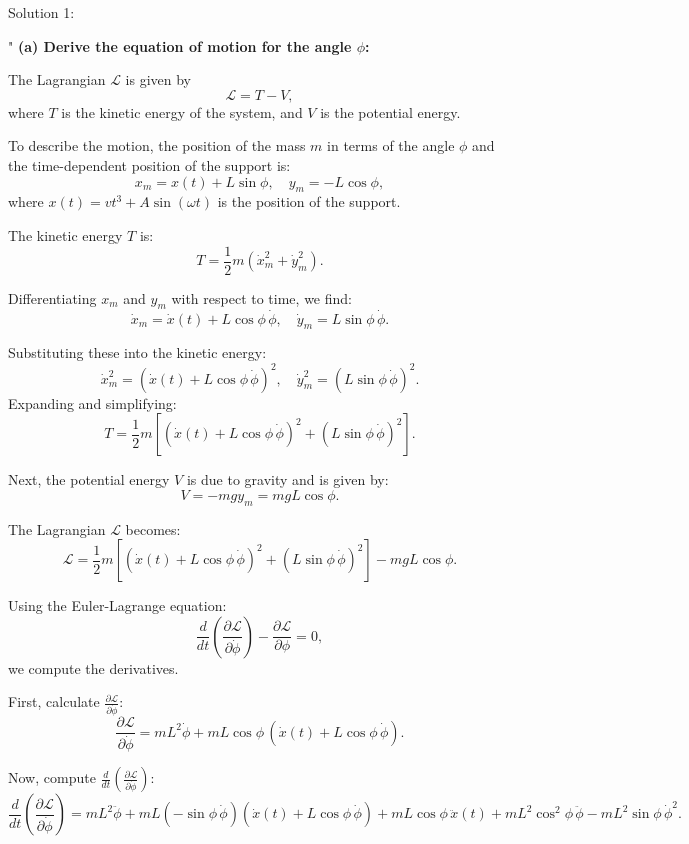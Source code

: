 Solution 1: 

"
\textbf{(a) Derive the equation of motion for the angle $\phi$:}

The Lagrangian $\mathcal{L}$ is given by
\[
\mathcal{L} = T - V,
\]
where $T$ is the kinetic energy of the system, and $V$ is the potential energy. 

To describe the motion, the position of the mass $m$ in terms of the angle $\phi$ and the time-dependent position of the support is:
\[
x_m = x(t) + L\sin\phi, \quad y_m = -L\cos\phi,
\]
where $x(t) = vt^3 + A\sin(\omega t)$ is the position of the support.

The kinetic energy $T$ is:
\[
T = \frac{1}{2}m\left(\dot{x}_m^2 + \dot{y}_m^2\right).
\]

Differentiating $x_m$ and $y_m$ with respect to time, we find:
\[
\dot{x}_m = \dot{x}(t) + L\cos\phi \, \dot{\phi}, \quad \dot{y}_m = L\sin\phi \, \dot{\phi}.
\]

Substituting these into the kinetic energy:
\[
\dot{x}_m^2 = \left(\dot{x}(t) + L\cos\phi \, \dot{\phi}\right)^2, \quad
\dot{y}_m^2 = \left(L\sin\phi \, \dot{\phi}\right)^2.
\]
Expanding and simplifying:
\[
T = \frac{1}{2}m \left[\left(\dot{x}(t) + L\cos\phi \, \dot{\phi}\right)^2 + \left(L\sin\phi \, \dot{\phi}\right)^2 \right].
\]

Next, the potential energy $V$ is due to gravity and is given by:
\[
V = -mg y_m = mgL\cos\phi.
\]

The Lagrangian $\mathcal{L}$ becomes:
\[
\mathcal{L} = \frac{1}{2}m \left[\left(\dot{x}(t) + L\cos\phi \, \dot{\phi}\right)^2 + \left(L\sin\phi \, \dot{\phi}\right)^2 \right] - mgL\cos\phi.
\]

Using the Euler-Lagrange equation:
\[
\frac{d}{dt} \left(\frac{\partial \mathcal{L}}{\partial \dot{\phi}}\right) - \frac{\partial \mathcal{L}}{\partial \phi} = 0,
\]
we compute the derivatives.

First, calculate $\frac{\partial \mathcal{L}}{\partial \dot{\phi}}$:
\[
\frac{\partial \mathcal{L}}{\partial \dot{\phi}} = mL^2\dot{\phi} + mL\cos\phi \, \left(\dot{x}(t) + L\cos\phi \, \dot{\phi}\right).
\]

Now, compute $\frac{d}{dt}\left(\frac{\partial \mathcal{L}}{\partial \dot{\phi}}\right)$:
\[
\frac{d}{dt}\left(\frac{\partial \mathcal{L}}{\partial \dot{\phi}}\right) = mL^2\ddot{\phi} + mL(-\sin\phi \, \dot{\phi})\left(\dot{x}(t) + L\cos\phi \, \dot{\phi}\right) + mL\cos\phi \, \ddot{x}(t) + mL^2\cos^2\phi \, \ddot{\phi} - mL^2\sin\phi \, \dot{\phi}^2.
\]

